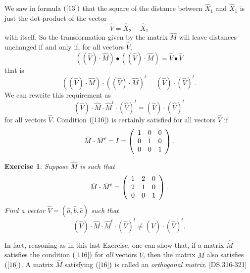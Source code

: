\documentclass{article}%
\newtheorem{exercise}[theorem]{Exercise}
\begin{document}
We saw in formula $\left(  \ref{13}\right)  $ that the square of the distance
between $\hat{X}_{1}$ and $\hat{X}_{1}$ is just the dot-product of the vector%
\[
\hat{V}=\hat{X}_{2}-\hat{X}_{1}%
\]
with itself. So the transformation given by the matrix $\hat{M}$ will leave
distances unchanged if and only if, for all vectors $\hat{V}$,%
\[
\left(  \left(  \hat{V}\right)  \cdot\hat{M}\right)  \bullet\left(  \left(
\hat{V}\right)  \cdot\hat{M}\right)  =\hat{V}\bullet\hat{V}%
\]
that is%
\[
\left(  \left(  \hat{V}\right)  \cdot\hat{M}\right)  \cdot\left(  \left(
\hat{V}\right)  \cdot\hat{M}\right)  ^{t}=\left(  \hat{V}\right)  \cdot\left(
\hat{V}\right)  ^{t}.
\]
We can rewrite this requirement as%
\begin{equation}
\left(  \hat{V}\right)  \cdot\hat{M}\cdot\hat{M}^{t}\cdot\left(  \hat
{V}\right)  ^{t}=\left(  \hat{V}\right)  \cdot\left(  \hat{V}\right)  ^{t}
\label{116}%
\end{equation}
for all vectors $\hat{V}$. Condition $\left(  \ref{116}\right)  $ is certainly
satisfied for all vectors $\hat{V}$ if
\begin{equation}
\hat{M}\cdot\hat{M}^{t}=I=\left(
\begin{array}
[c]{ccc}%
1 & 0 & 0\\
0 & 1 & 0\\
0 & 0 & 1
\end{array}
\right)  . \label{16}%
\end{equation}


\begin{exercise}
Suppose $\hat{M}$ is such that%
\[
\hat{M}\cdot\hat{M}^{t}=\left(
\begin{array}
[c]{ccc}%
1 & 2 & 0\\
2 & 1 & 0\\
0 & 0 & 1
\end{array}
\right)  .
\]
Find a vector $\hat{V}=\left(  \hat{a},\hat{b},\hat{c}\right)  $ such that%
\[
\left(  \hat{V}\right)  \cdot\hat{M}\cdot\hat{M}^{t}\cdot\left(  \hat
{V}\right)  ^{t}\neq\left(  \hat{V}\right)  \cdot\left(  \hat{V}\right)
^{t}.
\]

\end{exercise}

In fact, reasoning as in this last Exercise, one can show that, if a matrix
$\hat{M}$ satisfies the condition $\left(  \ref{116}\right)  $ for
\textit{all} vectors $\hat{V}$, then the matrix $\hat{M}$ also satisfies
$\left(  \ref{16}\right)  $. A matrix $\hat{M}$ satisfying $\left(
\ref{16}\right)  $ is called an \textit{orthogonal matrix}. [DS,316-321]
\end{document}
